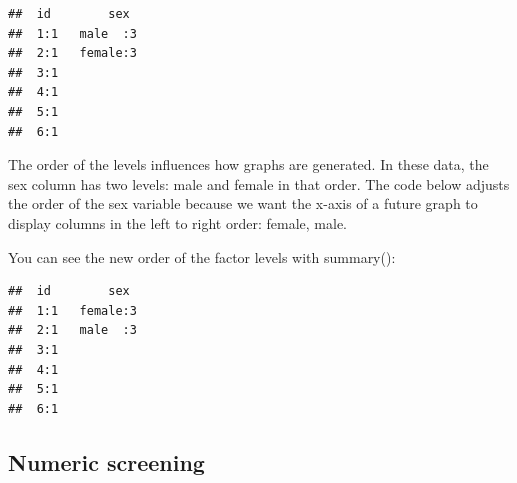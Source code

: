 \documentclass[
]{krantz}
\makeatletter
\newenvironment{Shaded}{\begin{snugshade}}{\end{snugshade}}
\newcommand{\DataTypeTok}[1]{\textcolor[rgb]{0.27,0.27,0.27}{#1}}
\newcommand{\KeywordTok}[1]{\textcolor[rgb]{0.27,0.27,0.27}{\textbf{#1}}}
\newcommand{\NormalTok}[1]{#1}
\newcommand{\OperatorTok}[1]{\textcolor[rgb]{0.43,0.43,0.43}{\textbf{#1}}}
\newcommand{\StringTok}[1]{\textcolor[rgb]{0.5,0.5,0.5}{#1}}
\newenvironment{kframe}{%
\medskip{}
\setlength{\fboxsep}{.8em}
 \def\at@end@of@kframe{}%
 \ifinner\ifhmode%
  \def\at@end@of@kframe{\end{minipage}}%
  \begin{minipage}{\columnwidth}%
 \fi\fi%
 \def\FrameCommand##1{\hskip\@totalleftmargin \hskip-\fboxsep
 \colorbox{shadecolor}{##1}\hskip-\fboxsep
     \hskip-\linewidth \hskip-\@totalleftmargin \hskip\columnwidth}%
 \MakeFramed {\advance\hsize-\width
   \@totalleftmargin\z@ \linewidth\hsize
   \@setminipage}}%
 {\par\unskip\endMakeFramed%
 \at@end@of@kframe}
\renewenvironment{Shaded}{\begin{kframe}}{\end{kframe}}
\makeatother
\begin{document}
\begin{Shaded}
\end{Shaded}

\begin{verbatim}
##  id        sex   
##  1:1   male  :3  
##  2:1   female:3  
##  3:1             
##  4:1             
##  5:1             
##  6:1
\end{verbatim}

The order of the levels influences how graphs are generated. In these data, the sex column has two levels: male and female in that order. The code below adjusts the order of the sex variable because we want the x-axis of a future graph to display columns in the left to right order: female, male.

\begin{Shaded}
\end{Shaded}

You can see the new order of the factor levels with summary():

\begin{Shaded}
\end{Shaded}

\begin{verbatim}
##  id        sex   
##  1:1   female:3  
##  2:1   male  :3  
##  3:1             
##  4:1             
##  5:1             
##  6:1
\end{verbatim}

\hypertarget{numeric-screening-2}{%
\subsection{Numeric screening}\label{numeric-screening-2}}
\end{document}
